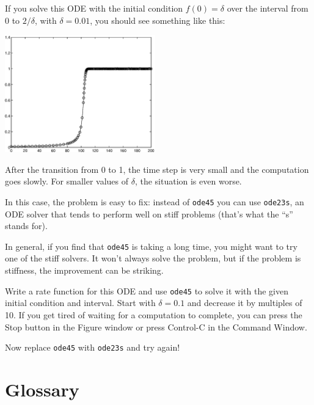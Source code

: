 \documentclass{book}
\begin{document}
If you solve this ODE with the initial condition $f(0) = \delta$ over
the interval from 0 to $2/\delta$, with $\delta = 0.01$, you should
see something like this:

\beforefig \centerline{\includegraphics[height=2in]{figs/stiff.eps}}

After the transition from 0 to 1, the time step is very small and the
computation goes slowly.  For smaller values of $\delta$, the
situation is even worse.

In this case, the problem is easy to fix: instead of {\tt ode45} you can
use {\tt ode23s}, an ODE solver that tends to perform well on stiff
problems (that's what the ``s'' stands for).

In general, if you find that {\tt ode45} is taking a long time, you
might want to try one of the stiff solvers.  It won't always solve
the problem, but if the problem is stiffness, the improvement can
be striking.

\begin{ex}
Write a rate function for this ODE and use
{\tt ode45} to solve it with the given initial condition and interval.
Start with $\delta = 0.1$ and decrease it by multiples of 10.  If
you get tired of waiting for a computation to complete, you can
press the Stop button in the Figure window or press Control-C in
the Command Window.

Now replace {\tt ode45} with {\tt ode23s} and try again!
\end{ex}



\section{Glossary}
\end{document}
